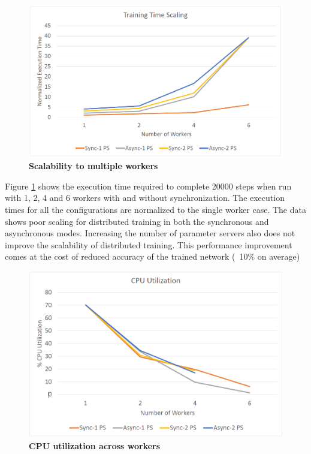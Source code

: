 \begin{figure}[h]
\centering
  \includegraphics[keepaspectratio,width=\columnwidth]{figures/scaling_train_time.PNG}
  \caption{\textbf{Scalability to multiple workers}}
  \label{fig:scalability}
\end{figure}

Figure \ref{fig:scalability} shows the execution time required 
to complete 20000 steps when run with 1, 2, 4 and 6 workers with
and without synchronization. The 
execution times for all the configurations are normalized to 
the single worker case. The data shows poor scaling for distributed
training in both the synchronous and asynchronous modes. Increasing
the number of parameter servers also does not improve the scalability
of distributed training.
This performance improvement
comes at the cost of reduced accuracy of the trained network (~10\%
on average)

\begin{figure}[h]
\centering
  \includegraphics[keepaspectratio,width=\columnwidth]{figures/cpu_util.PNG}
  \caption{\textbf{CPU utilization across workers}}
  \label{fig:cpuutil}
\end{figure}

